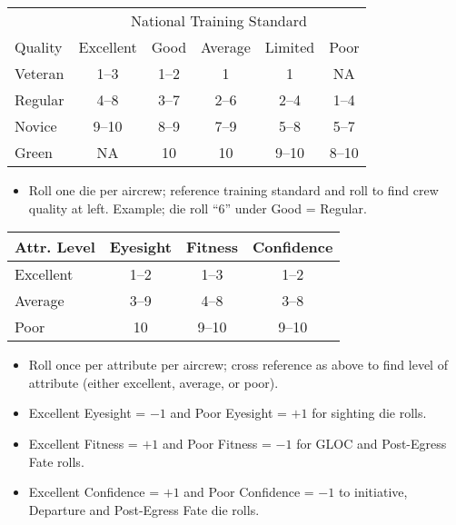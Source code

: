 \begin{TABLE}
\small
\begin{tabularx}{\linewidth}{l*{5}{c}}
\toprule
&\multicolumn{5}{c}{National Training Standard}\\
\cmidrule(){2-6}
Quality&Excellent&Good&Average&Limited&Poor\\
\midrule
Veteran&1--3&1--2&1&1&NA\\
Regular&4--8&3--7&2--6&2--4&1--4\\
Novice&9--10&8--9&7--9&5--8&5--7\\
Green&NA&10&10&9--10&8--10\\
\bottomrule
\end{tabularx}
\begin{tablenote}{\linewidth}
\begin{itemize}[nosep]
    \item Roll one die per aircrew; reference training standard and roll to find crew quality at left. Example; die roll “6” under Good = Regular.
\end{itemize}
\end{tablenote}

\vspace{\floatsep}

\small
\begin{tabularx}{\linewidth}{lCCC}
\toprule
Attr. Level&Eyesight&Fitness&Confidence\\
\midrule
Excellent&1--2&1--3&1--2\\
Average&3--9&4--8&3--8\\
Poor&10&9--10&9--10\\
\bottomrule
\end{tabularx}
\begin{tablenote}{\linewidth}
\begin{itemize}[nosep]
    \item Roll once per attribute per aircrew; cross reference as above to find level of attribute (either excellent, average, or poor).
    \item Excellent Eyesight = $-1$ and Poor Eyesight = $+1$ for sighting die rolls.
    \item Excellent Fitness = $+1$ and Poor Fitness = $-1$ for GLOC and Post-Egress Fate rolls.
    \item Excellent Confidence = $+1$ and Poor Confidence = $-1$ to initiative, Departure and Post-Egress Fate die rolls.
\end{itemize}
\end{tablenote}


\end{TABLE}
